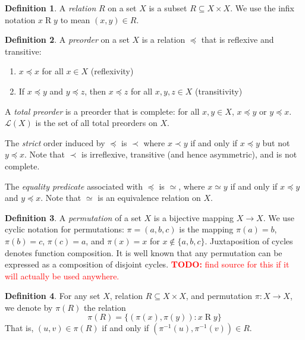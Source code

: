 \documentclass{article}
\theoremstyle{definition} \newtheorem{definition}{Definition}
\theoremstyle{definition} \newtheorem{example}{Example}
\theoremstyle{plain} \newtheorem{axiom}{Axiom}
\theoremstyle{plain} \newtheorem*{remark}{Remark}
\theoremstyle{remark} \newtheorem*{notation}{Notation}
\theoremstyle{plain} \newtheorem{lemma}{Lemma}
\theoremstyle{plain} \newtheorem{proposition}{Proposition}
\newcommand{\todo}[1] {
    \textcolor{red}{
        \textbf{TODO:} #1
    }
}
\newcommand{\orderings}{\mathcal{L}}
\begin{document}
\begin{definition}
A \emph{relation} $R$ on a set $X$ is a subset $R \subseteq X \times X$. We
use the infix notation $x \mathbin{R} y$ to mean $(x, y) \in R$.
\end{definition}

\begin{definition}
A \emph{preorder} on a set $X$ is a relation $\preceq$ that is reflexive and
transitive:
\begin{enumerate}
\item $x \preceq x$ for all $x \in X$ (reflexivity)
\item If $x \preceq y$ and $y \preceq z$, then $x \preceq z$ for all $x, y, z
\in X$ (transitivity)
\end{enumerate}

A \emph{total preorder} is a preorder that is complete: for all $x, y \in X$,
$x \preceq y$ or $y \preceq x$. $\orderings(X)$ is the set of all total
preorders on $X$.

The \emph{strict} order induced by $\preceq$ is $\prec$ where $x \prec y$ if
and only if $x \preceq y$ but not $y \preceq x$. Note that $\prec$ is
irreflexive, transitive (and hence asymmetric), and is not complete.

The \emph{equality predicate} associated with $\preceq$ is $\simeq$, where $x
\simeq y$ if and only if $x \preceq y$ and $y \preceq x$. Note that $\simeq$ is
an equivalence relation on $X$.

\end{definition}

\begin{definition}
A \emph{permutation} of a set $X$ is a bijective mapping $X \rightarrow X$. We
use cyclic notation for permutations: $\pi=(a, b, c)$ is the mapping $\pi(a) =
b$, $\pi(b) = c$, $\pi(c) = a$, and $\pi(x) = x$ for $x \notin \{a, b, c\}$.
Juxtaposition of cycles denotes function composition. It is well known that any
permutation can be expressed as a composition of disjoint cycles.\todo{find
source for this if it will actually be used anywhere.}
\end{definition}

\begin{definition}
For any set $X$, relation $R \subseteq X \times X$, and permutation $\pi: X
\rightarrow X$, we denote by $\pi(R)$ the relation
$$ \pi(R) = \{(\pi(x), \pi(y)) : x \mathbin{R} y\} $$
That is, $(u, v) \in \pi(R)$ if and only if $(\pi^{-1}(u), \pi^{-1}(v)) \in R$.
\end{definition}
\end{document}
